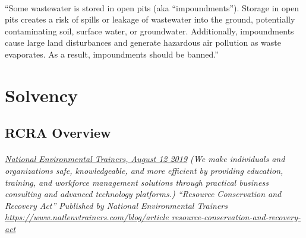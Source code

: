 \documentclass{article}
\begin{document}
\paragraph{}
``Some wastewater is stored in open pits (aka “impoundments”). Storage in open pits creates a risk of spills or leakage of wastewater into the ground, potentially contaminating soil, surface water, or groundwater. Additionally, impoundments cause large land disturbances and generate hazardous air pollution as waste evaporates. As a result, impoundments should be banned.”

\section{Solvency}

\subsection{RCRA Overview}
\paragraph{}
\small
\textit{
\underline{National Environmental Trainers, August 12 2019}
(We make individuals and organizations safe, knowledgeable, and more efficient by providing education, training, and workforce management solutions through practical business consulting and advanced technology platforms.) “Resource Conservation and Recovery Act” Published by National Environmental Trainers  
\url{https://www.natlenvtrainers.com/blog/article resource-conservation-and-recovery- act}}
\normalsize
\end{document}
